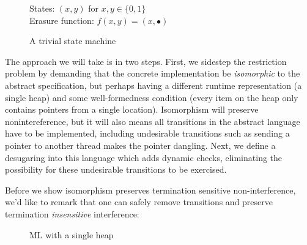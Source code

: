 \begin{figure}
    States: $(x,y)$ for $x,y \in \{0,1\}$ \\
    Erasure function: $f(x,y) = (x,\bullet)$

    \begin{center}\end{center}

    \label{fig:trivial-sm}
    \caption{A trivial state machine}
\end{figure}

The approach we will take is in two steps.  First, we sidestep the
restriction problem by demanding that the concrete implementation be
\emph{isomorphic} to the abstract specification, but perhaps having a different
runtime representation (a single heap) and some well-formedness
condition (every item on the heap only contains pointers from a single
location).  Isomorphism will preserve nonintereference, but it will also means all
transitions in the abstract language have to be implemented, including
undesirable transitions such as sending a pointer to another thread makes
the pointer dangling.  Next, we define a desugaring into this language
which adds dynamic checks, eliminating the possibility for these undesirable
transitions to be exercised.


Before we show isomorphism preserves termination sensitive
non-interference, we'd like to remark that one can safely remove transitions
and preserve termination \emph{insensitive} interference:


\begin{figure}


\caption{ML with a single heap}
\label{fig:comb}
\end{figure}

